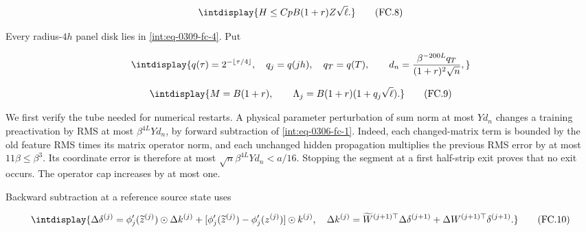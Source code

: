 \begingroup\renewcommand{\theHequation}{intdisplay.700}
\begin{equation}
\intdisplay{
H\le CpB(1+r)Z\sqrt\ell.
}
\tag{FC.8}
\label{int:eq-0313-fc-8}
\end{equation}
\endgroup


Every radius-\(4h\) panel disk lies in \eqref{int:eq-0309-fc-4}. Put


\begingroup\renewcommand{\theHequation}{intdisplay.701}
\begin{equation*}
\intdisplay{
q(\tau)=2^{-\lfloor\tau/4\rfloor},\quad q_j=q(jh),\quad
q_T=q(T),\qquad
d_n=\frac{\beta^{-200L}q_T}{(1+r)^2\sqrt n},
}
\end{equation*}
\endgroup

\begingroup\renewcommand{\theHequation}{intdisplay.702}
\begin{equation}
\intdisplay{
M=B(1+r),\qquad \Lambda_j=B(1+r)(1+q_j\sqrt\ell).
}
\tag{FC.9}
\label{int:eq-0314-fc-9}
\end{equation}
\endgroup


We first verify the tube needed for numerical restarts. A physical parameter perturbation of sum norm at most \(Yd_n\) changes a training preactivation by RMS at most \(\beta^{4L}Yd_n\), by forward subtraction of \eqref{int:eq-0306-fc-1}. Indeed, each changed-matrix term is bounded by the old feature RMS times its matrix operator norm, and each unchanged hidden propagation multiplies the previous RMS error by at most \(11\beta\le\beta^3\). Its coordinate error is therefore at most \(\sqrt n\beta^{4L}Yd_n<a/16\). Stopping the segment at a first half-strip exit proves that no exit occurs. The operator cap increases by at most one.



Backward subtraction at a reference source state uses


\begingroup\renewcommand{\theHequation}{intdisplay.703}
\begin{equation}
\intdisplay{
\Delta\delta^{(j)}=\phi_j'(\widetilde z^{(j)})\odot\Delta k^{(j)}
+[\phi_j'(\widetilde z^{(j)})-\phi_j'(z^{(j)})]\odot k^{(j)},
\quad
\Delta k^{(j)}=\widetilde W^{(j+1)\top}\Delta\delta^{(j+1)}
+\Delta W^{(j+1)\top}\delta^{(j+1)}.
}
\tag{FC.10}
\label{int:eq-0315-fc-10}
\end{equation}
\endgroup

